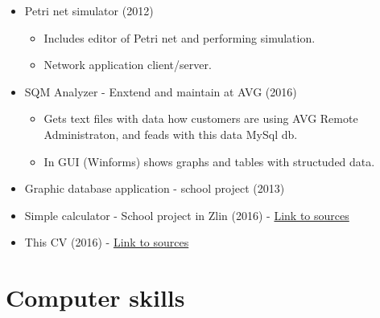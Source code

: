 \documentclass[11pt,a4paper,sans]{moderncv}        %
\begin{document}
{
\begin{itemize}
	\item Petri net simulator (2012)	
	\begin{itemize}
		\item Includes editor of Petri net and performing simulation.
		\item Network application client/server.
	\end{itemize}
\end{itemize}
}

{
\begin{itemize}
	\item SQM Analyzer - Enxtend and maintain at AVG (2016)
	\begin{itemize}
		\item Gets text files with data how customers are using AVG Remote Administraton, and feads with this data MySql db. 	
		\item In GUI (Winforms) shows graphs and tables with structuded data.
	\end{itemize}
	\item Graphic database application - school project (2013)	
\end{itemize}
}

{
\begin{itemize}
	\item Simple calculator - School project in Zlin (2016) - \href{https://github.com/navrkald/Zlin_wxWidgets_python_simple_calculator}{Link to sources} 
\end{itemize}
}

\cvitemwithcomment{\LaTeX}{}
{
\begin{itemize}
	\item This CV (2016) - \href{https://github.com/navrkald/CV_david_navrkal}{Link to sources} 
\end{itemize}
}

\section{Computer skills}

\end{document}
